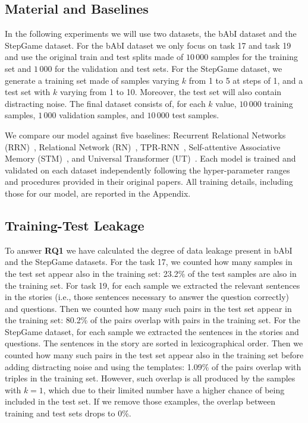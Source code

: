 \documentclass[letterpaper]{article} \usepackage{aaai22}  \usepackage{times}  \usepackage{helvet}  \usepackage{courier}  \usepackage[hyphens]{url}  \usepackage{graphicx} \urlstyle{rm} \def\UrlFont{\rm}  \usepackage{natbib}  \usepackage{caption} \DeclareCaptionStyle{ruled}{labelfont=normalfont,labelsep=colon,strut=off} \frenchspacing  \setlength{\pdfpagewidth}{8.5in}  \setlength{\pdfpageheight}{11in}  \usepackage{algorithm}
\begin{document}
\subsection{Material and Baselines}

In the following experiments we will use two datasets, the bAbI dataset and the StepGame dataset.
For the bAbI dataset we only focus on task 17 and task 19 and use the original train and test splits made of $10\,000$ samples for the training set and $1\,000$ for the validation and test sets.
For the StepGame dataset, we generate a training set made of samples varying $k$ from 1 to 5 at steps of 1, and a test set with $k$ varying from 1 to 10. Moreover, the test set will also contain distracting noise. The final dataset consists of, for each $k$ value, $10\,000$ training samples, $1\,000$ validation samples, and $10\,000$ test samples. 

We compare our model against five baselines: 
Recurrent Relational Networks (RRN)~\cite{palm2018recurrent}, Relational Network (RN)~\cite{santoro2017simple}, TPR-RNN~\cite{schlag2018learning}, Self-attentive Associative Memory (STM)~\cite{le2020self}, and 
Universal Transformer (UT)~\cite{dehghani2018universal}. 
Each model is trained and validated on each dataset independently following the hyper-parameter ranges and procedures provided in their original papers.
All training details, including those for our model, are reported in the Appendix.

\subsection{Training-Test Leakage}

To answer \textbf{RQ1} 
we have calculated the degree of data leakage present in bAbI and the StepGame datasets.
For the task 17, we counted how many samples in the test set appear also in the training set: 23.2\% of the test samples are also in the training set.
For task 19, for each sample we extracted the relevant sentences in the stories (i.e., those sentences necessary to answer the question correctly) and questions. Then we counted how many such pairs in the test set appear in the training set: 
80.2\% of the pairs overlap with pairs in the training set.
For the StepGame dataset, for each sample we extracted the sentences in the stories and questions. The sentences in the story are sorted in lexicographical order. Then we counted how many such pairs in the test set appear also in the training set before adding distracting noise and using the templates: 
1.09\% of the pairs overlap with triples in the training set. 
However, such overlap is all produced by the samples with $k=1$, which due to their limited number have a higher chance of being included in the test set.
If we remove those examples, the overlap between training and test sets drops to 0\%.
\end{document}
